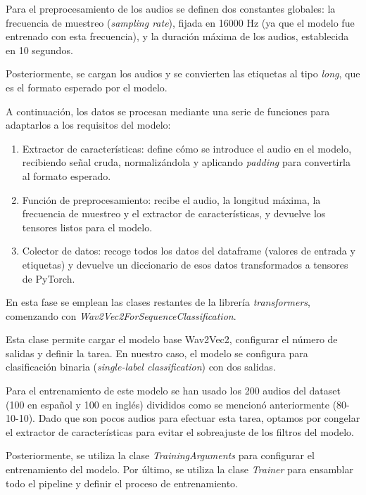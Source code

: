 Para el preprocesamiento de los audios se definen dos constantes globales: la frecuencia de muestreo (\textit{sampling rate}), fijada en 16000 Hz (ya que el modelo fue entrenado con esta frecuencia), y la duración máxima de los audios, establecida en 10 segundos.

Posteriormente, se cargan los audios y se convierten las etiquetas al tipo \textit{long}, que es el formato esperado por el modelo.

A continuación, los datos se procesan mediante una serie de funciones para adaptarlos a los requisitos del modelo:

\begin{enumerate}
 \item Extractor de características: define cómo se introduce el audio en el modelo, recibiendo señal cruda, normalizándola y aplicando \textit{padding} para convertirla al formato esperado.
 
 \item Función de preprocesamiento: recibe el audio, la longitud máxima, la frecuencia de muestreo y el extractor de características, y devuelve los tensores listos para el modelo.
 
 \item Colector de datos: recoge todos los datos del dataframe (valores de entrada y etiquetas) y devuelve un diccionario de esos datos transformados a tensores de PyTorch.
\end{enumerate}

En esta fase se emplean las clases restantes de la librería \textit{transformers}, comenzando con \textit{Wav2Vec2ForSequenceClassification}.

Esta clase permite cargar el modelo base Wav2Vec2, configurar el número de salidas y definir la tarea. En nuestro caso, el modelo se configura para clasificación binaria (\textit{single-label classification}) con dos salidas.

Para el entrenamiento de este modelo se han usado los 200 audios del dataset (100 en español y 100 en inglés) divididos como se mencionó anteriormente (80-10-10). Dado que son pocos audios para efectuar esta tarea, optamos por congelar el extractor de características para evitar el sobreajuste de los filtros del modelo.

Posteriormente, se utiliza la clase \textit{TrainingArguments} para configurar el entrenamiento del modelo. Por último, se utiliza la clase \textit{Trainer} para ensamblar todo el pipeline y definir el proceso de entrenamiento.

